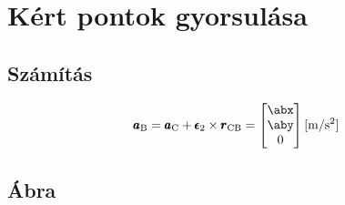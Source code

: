 \section{Kért pontok gyorsulása}

\subsection{Számítás}
\begin{equation}
	\pmb{a}_\text{B} = \pmb{a}_\text{C} + \pmb{\epsilon}_2 \times \pmb{r}_\text{CB} =
	\begin{bmatrix}
		\abx \\ \aby \\ 0
	\end{bmatrix} \siunit{}{\m\per\second^2}
\end{equation}

\subsection{Ábra}
\structureacceleration

